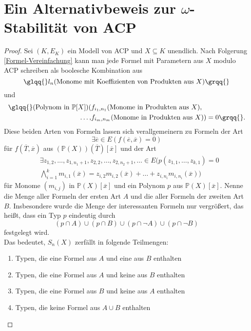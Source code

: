 \renewcommand\thesection{\Alph{section}}
\section{Ein Alternativbeweis zur $\omega$-Stabilität von ACP}

\begin{proof}
	Sei $(K,E_K)$ ein Modell von ACP und $X\subseteq K$ unendlich. Nach Folgerung \ref{Formel-Vereinfachung} kann man jede Formel mit Parametern aus $X$ modulo ACP schreiben als boolesche Kombination aus $$\glqq{}l_n(\text{Monome mit Koeffizienten von Produkten aus }X)\grqq{}$$ und
	\begin{align*}
	\text{\glqq{}}(\text{Polynom in }\mathbb{P}[X])(&f_{i_1,n_1}(\text{Monome in Produkten aus }X),\\\dots,&f_{i_m,n_m}(\text{Monome in Produkten aus }X))=0\grqq{}.
	\end{align*}
	Diese beiden Arten von Formeln lassen sich verallgemeinern
    zu Formeln der Art $${\exists\overline{e}\in E(f(\overline{e},\overline{x})=0)}$$ für  $f(\overline{T},\overline{x})$ aus $(\mathbb{P}(X))(\overline{T})[\overline{x}]$ und der Art
	\begin{align*}
	&\exists z_{1,2},\dots,z_{1,n_1+1},z_{2,2},\dots,z_{2,n_2+1},\dots\in E(p(z_{1,1},\dots,z_{k,1})=0\\
	&\bigwedge\limits_{i=1}^km_{i,1}(\overline{x})=z_{i,2}m_{i,2}(\overline{x})+\dots+z_{i,n_i}m_{i,n_i}(\overline{x}))
	\end{align*}
	für Monome $(m_{i,j})$ in $\mathbb{P}(X)[\overline{x}]$ und ein Polynom $p$ aus $\mathbb{P}(X)[\overline{x}]$. Nenne die Menge aller Formeln der ersten Art $A$ und die aller Formeln der zweiten Art $B$. Insbesondere wurde die Menge der \glqq{}interessanten\grqq{} Formeln nur vergrößert, das heißt, dass ein Typ $p$ eindeutig durch $$(p\cap A)\cup(p\cap B)\cup(p\cap\neg A)\cup(p\cap\neg B)$$ festgelegt wird.\\
	Das bedeutet, $S_n(X)$ zerfällt in folgende Teilmengen:
	\begin{enumerate}
		\item Typen, die eine Formel aus $A$ und eine aus $B$ enthalten
		\item Typen, die eine Formel aus $A$ und keine aus $B$ enthalten
		\item Typen, die eine Formel aus $B$ und keine aus $A$ enthalten
		\item Typen, die keine Formel aus $A\cup B$ enthalten

\end{enumerate}
\end{proof}
